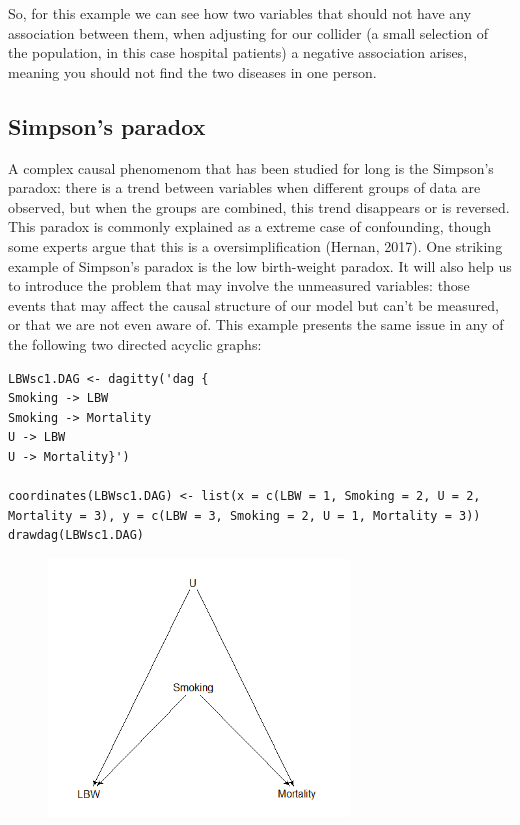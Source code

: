 \documentclass{article}
\begin{document}
So, for this example we can see how two variables that should not have any association between them, when adjusting for our collider (a small selection of the population, in this case hospital patients) a negative association arises, meaning you should not find the two diseases in one person.



\subsection{Simpson's paradox}

A complex causal phenomenom that has been studied for long is the Simpson's paradox: there is a trend between variables when different groups of data are observed, but when the groups are combined, this trend disappears or is reversed. This paradox is commonly explained as a extreme case of confounding, though some experts argue that this is a oversimplification (Hernan, 2017).
One striking example of Simpson's paradox is the low birth-weight paradox. It will also help us to introduce the problem that may involve the unmeasured variables: those events that may affect the causal structure of our model but can't be measured, or that we are not even aware of. This example presents the same issue in any of the following two directed acyclic graphs:
\begin{lstlisting}
LBWsc1.DAG <- dagitty('dag {
Smoking -> LBW
Smoking -> Mortality
U -> LBW
U -> Mortality}')

coordinates(LBWsc1.DAG) <- list(x = c(LBW = 1, Smoking = 2, U = 2, Mortality = 3), y = c(LBW = 3, Smoking = 2, U = 1, Mortality = 3))
drawdag(LBWsc1.DAG)
\end{lstlisting}
\begin{figure}[h]
\includegraphics[width=8cm]{LBW1DAG.png}
\centering
\end{figure}
\newpage
\end{document}
